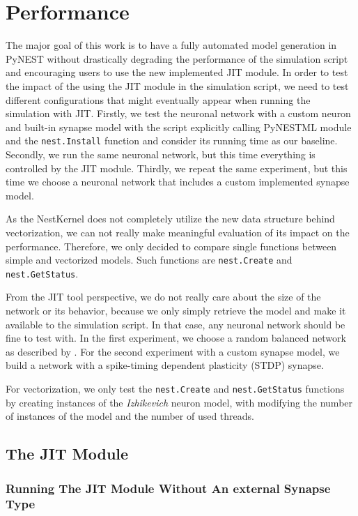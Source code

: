 \chapter{Performance}
 \label{chap:perf}
 
 The major goal of this work is to have a fully automated model generation in PyNEST without drastically degrading the performance of the simulation script and encouraging users to use the new implemented JIT module. In order to test the impact of the using the JIT module in the simulation script, we need to test different configurations that might eventually appear when running the simulation with JIT. Firstly, we test the neuronal network with a custom neuron and built-in synapse model with the script explicitly calling PyNESTML module and the \texttt{nest.Install} function and  consider its running time as our baseline. Secondly, we run the same neuronal network, but this time everything is controlled by the JIT module. Thirdly, we repeat the same experiment, but this time we choose a neuronal network that includes a custom implemented synapse model.
 
 As the NestKernel does not completely utilize the new data structure behind vectorization, we can not really make meaningful evaluation of its impact on the performance. Therefore, we only decided to compare single functions between simple and vectorized models. Such functions are \texttt{nest.Create} and \texttt{nest.GetStatus}.
 
 From the JIT tool perspective, we do not really care about the size of the network or its behavior, because we only simply retrieve the model and make it available to the simulation script. In that case, any neuronal network should be fine to test with. In the first experiment, we choose a random balanced network as  described by \citet{brunel2000dynamics}. For the second experiment with a custom synapse model, we build a network with a spike-timing dependent plasticity (STDP) synapse.
 
 
 For vectorization, we only test the \texttt{nest.Create} and \texttt{nest.GetStatus} functions by creating instances of the \emph{Izhikevich} \citep{1257420} neuron model, with modifying the number of instances of the model and the number of used threads.
 
\section{The JIT Module}

\subsection{Running The JIT Module Without An external Synapse Type}

